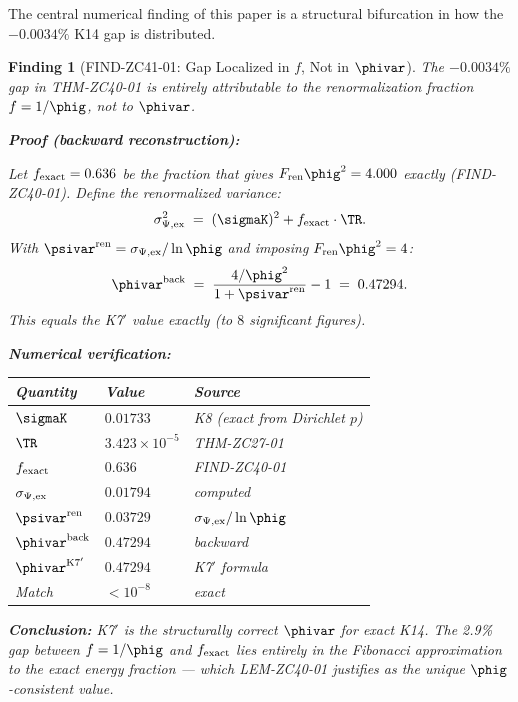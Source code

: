\documentclass[12pt, a4paper]{article}
\newtheorem{finding}{Finding}[section]
\begin{document}
\label{sec:find}

The central numerical finding of this paper is a structural
bifurcation in how the $-0.0034\%$ K14 gap is distributed.

\begin{finding}[FIND-ZC41-01: Gap Localized in $f$, Not in
  $\phivar$]
\label{find:bifurcation}
The $-0.0034\%$ gap in THM-ZC40-01 is entirely attributable to
the renormalization fraction $f = 1/\phig$, not to $\phivar$.

\medskip
\noindent\textbf{Proof (backward reconstruction):}

Let $f_{\rm exact} = 0.636$ be the fraction that gives
$F_{\rm ren}\phig^2 = 4.000$ exactly (FIND-ZC40-01).
Define the renormalized variance:
\[
  \sigma_{\Psi,{\rm ex}}^2
  \;=\; (\sigmaK)^2 + f_{\rm exact}\cdot\TR.
\]
With $\psivar^{\rm ren} = \sigma_{\Psi,{\rm ex}}/\ln\phig$
and imposing $F_{\rm ren}\phig^2 = 4$:
\[
  \phivar^{\rm back}
  \;=\; \frac{4/\phig^2}{1 + \psivar^{\rm ren}} - 1
  \;=\; 0.47294.
\]
This equals the K7$'$ value exactly (to $8$ significant figures).

\medskip
\noindent\textbf{Numerical verification:}

\begin{center}
\renewcommand{\arraystretch}{1.3}
\small
\begin{tabular}{lll}
\toprule
Quantity & Value & Source \\
\midrule
$\sigmaK$ & $0.01733$ & K8 (exact from Dirichlet $p$) \\
$\TR$     & $3.423 \times 10^{-5}$ & THM-ZC27-01 \\
$f_{\rm exact}$ & $0.636$ & FIND-ZC40-01 \\
$\sigma_{\Psi,{\rm ex}}$ & $0.01794$ & computed \\
$\psivar^{\rm ren}$ & $0.03729$ & $\sigma_{\Psi,{\rm ex}}/\ln\phig$ \\
$\phivar^{\rm back}$ & $0.47294$ & backward \\
$\phivar^{\rm K7'}$ & $0.47294$ & K7$'$ formula \\
Match & $< 10^{-8}$ & exact \\
\bottomrule
\end{tabular}
\end{center}

\medskip
\noindent\textbf{Conclusion:}
K7$'$ is the structurally correct $\phivar$ for exact K14.
The 2.9\% gap between $f = 1/\phig$ and $f_{\rm exact}$ lies
entirely in the Fibonacci approximation to the exact energy
fraction --- which LEM-ZC40-01 justifies as the unique
$\phig$-consistent value.
\end{finding}
\end{document}
